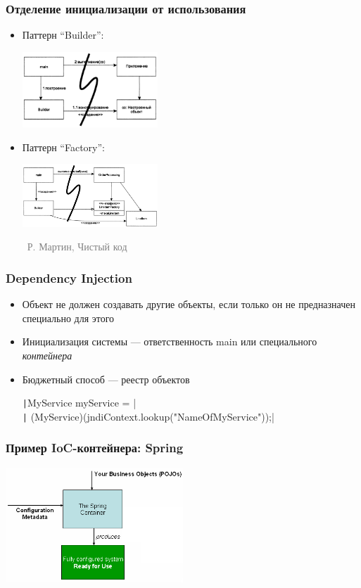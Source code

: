 \documentclass[xetex,mathserif,serif]{beamer}
\newcommand{\attribution}[1] {
	\begin{flushright}\begin{scriptsize}\textcolor{gray}{\textcopyright\, #1}\end{scriptsize}\end{flushright}
}
\begin{document}
	\begin{frame}
		\frametitle{Отделение инициализации от использования}
		\begin{itemize}
			\item Паттерн ``Builder'':
				\begin{center}
					\includegraphics[width=0.4\textwidth]{builder.png}
				\end{center}
			\item Паттерн ``Factory'':
				\begin{center}
					\includegraphics[width=0.4\textwidth]{factory.png}
					\attribution{Р. Мартин, Чистый код}
				\end{center}
		\end{itemize}
	\end{frame}

	\begin{frame}
		\frametitle{Dependency Injection}
		\begin{itemize}
			\item Объект не должен создавать другие объекты, если только он не предназначен специально для этого
			\item Инициализация системы --- ответственность main или специального \textit{контейнера}
			\item Бюджетный способ --- реестр объектов

				\texttt|MyService myService = | \\
				\texttt|    (MyService)(jndiContext.lookup("NameOfMyService"));|
		\end{itemize}
	\end{frame}

	\begin{frame}
		\frametitle{Пример IoC-контейнера: Spring}
		\begin{center}
			\includegraphics[width=0.5\textwidth]{springIoC.png}
		\end{center}
	\end{frame}
\end{document}
